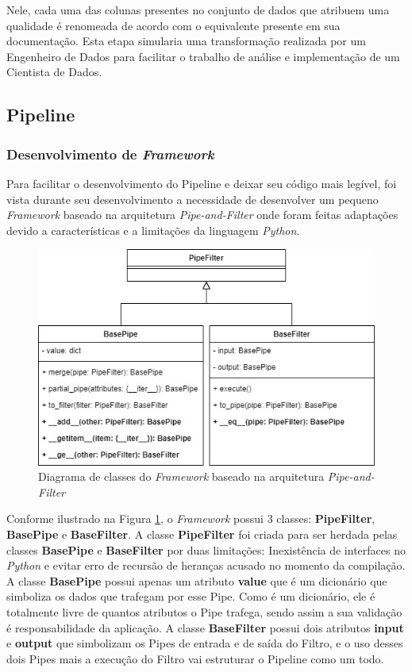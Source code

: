 \documentclass[portugues]{ic-tese}
\begin{document}
Nele, cada uma das colunas presentes no conjunto de dados que atribuem uma qualidade é renomeada de acordo com o equivalente presente em sua documentação. Esta etapa simularia uma transformação realizada por um Engenheiro de Dados para facilitar o trabalho de análise e implementação de um Cientista de Dados.

\subsection{Pipeline}

\subsubsection{Desenvolvimento de \textit{Framework}}

Para facilitar o desenvolvimento do Pipeline e deixar seu código mais legível, foi vista durante seu desenvolvimento a necessidade de desenvolver um pequeno \textit{Framework} baseado na arquitetura \textit{Pipe-and-Filter} onde foram feitas adaptações devido a características e a limitações da linguagem \textit{Python}.

\begin{figure}[H]
\centering
\includegraphics[scale=0.8]{images/classdiagram_Pipe-and-Filter_framework.jpg}
\caption {Diagrama de classes do \textit{Framework} baseado na arquitetura \textit{Pipe-and-Filter}}
\label{fig:PipeAndFilterFramework}
\end{figure}

Conforme ilustrado na Figura \ref{fig:PipeAndFilterFramework}, o \textit{Framework} possui 3 classes: \textbf{PipeFilter}, \textbf{BasePipe} e \textbf{BaseFilter}. A classe \textbf{PipeFilter} foi criada para ser herdada pelas classes \textbf{BasePipe} e \textbf{BaseFilter} por duas limitações: Inexistência de interfaces no \textit{Python} e evitar erro de recursão de heranças acusado no momento da compilação. A classe \textbf{BasePipe} possui apenas um atributo \textbf{value} que é um dicionário que simboliza os dados que trafegam por esse Pipe. Como é um dicionário, ele é totalmente livre de quantos atributos o Pipe trafega, sendo assim a sua validação é responsabilidade da aplicação. A classe \textbf{BaseFilter} possui dois atributos \textbf{input} e \textbf{output} que simbolizam os Pipes de entrada e de saída do Filtro, e o uso desses dois Pipes mais a execução do Filtro vai estruturar o Pipeline como um todo.
\end{document}
